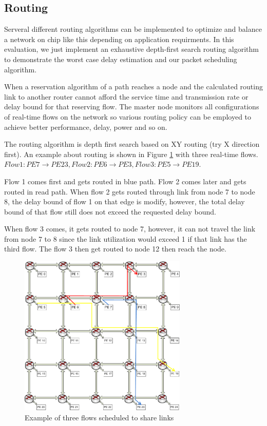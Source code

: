 \documentclass[conference, twocolumn]{IEEEtran}
\theoremstyle{definition}
\begin{document}
\subsection{Routing}

Serveral different routing algorithms can be implemented to optimize and balance
a network on chip like this depending on application requirments. In this
evaluation, we just implement an exhaustive depth-first search routing algorithm
to demonstrate the worst case delay estimation and our packet scheduling algorithm.

When a reservation algorithm of a path reaches a node and the calculated routing
link to another router cannot afford the service time and transmission rate or delay 
bound for that reserving flow. The master node monitors all configurations of
real-time flows on the network so various routing policy can be employed to
achieve better performance, delay, power and so on.

The routing algorithm is depth first search based on XY routing (try X
direction first). An example about routing is shown in Figure
\ref{fig:3FlowsEx} with three real-time flows. $Flow 1: PE7 \rightarrow
PE23, Flow 2: PE6 \rightarrow PE3, Flow 3: PE5 \rightarrow PE19$.

Flow 1 comes first and gets routed in blue path. Flow 2 comes later and gets
routed in read path.  When flow 2 gets routed through link from node 7 to node
8, the delay bound of flow 1 on that edge is modify, however, the total delay
bound of that flow still does not exceed the requested delay bound.

When flow 3 comes, it gets routed to node 7, however, it can not travel the
link from node 7 to 8 since the link utilization would exceed 1 if that link
has the third flow. The flow 3 then get routed to node 12 then reach the node.

\begin{figure}[htp]
\centering
\includegraphics[width=8cm]{pics/Example.png}
\caption[Three flows example.]
{Example of three flows scheduled to share links}\label{fig:3FlowsEx}
\end{figure}
\end{document}
